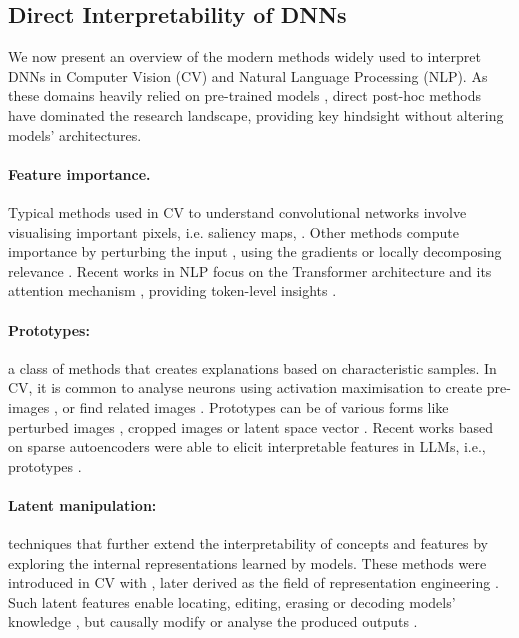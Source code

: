 \subsection{Direct Interpretability of DNNs}
\label{sec:background_interp}

We now present an overview of the modern methods widely used to interpret DNNs in Computer Vision (CV) and Natural Language Processing (NLP). As these domains heavily relied on pre-trained models \cite{Simonyan2014VeryDC,He2015DeepRL, Radford2018ImprovingLU}, direct post-hoc methods have dominated the research landscape, providing key hindsight without altering models' architectures.


\paragraph{Feature importance.} Typical methods used in CV to understand convolutional networks involve visualising important pixels, i.e. saliency maps, \cite{Zeiler2013VisualizingAU,Selvaraju2016GradCAMVE}. Other methods compute importance by perturbing the input \cite{Covert2020ExplainingBR}, using the gradients \cite{Radford2015UnsupervisedRL,Selvaraju2016GradCAMVE,Shrikumar2016NotJA, Smilkov2017SmoothGradRN} or locally decomposing relevance \cite{Montavon2015ExplainingNC,Bach2015OnPE}. Recent works in NLP focus on the Transformer architecture and its attention mechanism \cite{Vaswani2017AttentionIA}, providing token-level insights \cite{Wiegreffe2019AttentionIN,Achtibat2024AttnLRPAL}. 


\paragraph{Prototypes:} a class of methods that creates explanations based on characteristic samples. In CV, it is common to analyse neurons using activation maximisation to create pre-images \cite{Mahendran2015VisualizingDC}, or find related images \cite{Chen2020ConceptWF}. Prototypes can be of various forms like perturbed images \cite{Ribeiro2018AnchorsHM}, cropped images \cite{Dreyer2023UnderstandingT} or latent space vector \cite{alain2018understanding,kim2018interpretability}. Recent works based on sparse autoencoders were able to elicit interpretable features in LLMs, i.e., prototypes \cite{Cunningham2023SparseAF}.

\paragraph{Latent manipulation:} techniques that further extend the interpretability of concepts and features by exploring the internal representations learned by models. These methods were introduced in CV with \cite{kim2018interpretability}, later derived as the field of representation engineering \cite{zou2023representation}. Such latent features enable locating, editing, erasing or decoding models' knowledge \cite{Meng2022LocatingAE,belrose2023leace, Ghandeharioun2024PatchscopesAU}, but causally modify or analyse the produced outputs \cite{rimsky2023steering, Kramar2024AtPAE}.

